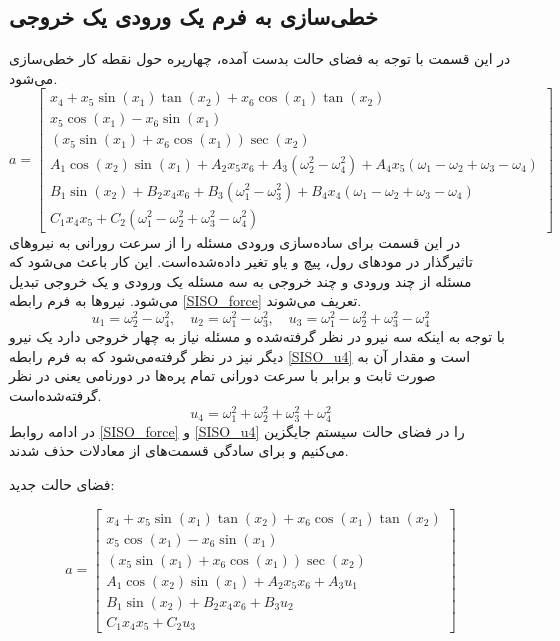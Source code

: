 \subsection{خطی‌سازی به فرم یک ورودی یک خروجی}\label{lin_SISO}
در این قسمت با توجه به فضای حالت بدست آمده، چهارپره حول نقطه کار خطی‌سازی می‌شود.
\begin{equation*}
	a = \begin{bmatrix}
		x_4 + x_5\sin(x_1)\tan(x_2) + x_6\cos(x_1)\tan(x_2)\\
		x_5\cos(x_1)- x_6\sin(x_1)\\
		(x_5\sin(x_1) + x_6\cos(x_1))\sec(x_2)\\
		A_1\cos(x_2)\sin(x_1) + 
		A_2x_5x_6 + A_3\left(\omega_2^2-\omega_4^2\right)+
		A_4x_5\left(\omega_1-\omega_2+\omega_3-\omega_4\right)\\
		B_1\sin(x_2) + 
		B_2x_4x_6 + B_3\left(\omega_1^2-\omega_3^2\right)+
		B_4x_4\left(\omega_1-\omega_2+\omega_3-\omega_4\right)\\
		C_1x_4x_5 + 
		C_2\left(\omega_1^2-\omega_2^2+\omega_3^2-\omega_4^2\right)
	\end{bmatrix}
\end{equation*} 
در این قسمت برای ساده‌سازی ورودی مسئله را از سرعت رورانی به نیروهای تاثیرگذار در مودهای رول، پیچ و یاو تغیر داده‌شده‌است. این کار باعث می‌شود که مسئله از چند ورودی و چند خروجی به سه مسئله یک ورودی و یک خروجی تبدیل می‌شود. نیروها به فرم رابطه 
\ref{SISO_force}
تعریف می‌شوند.
\begin{equation}\label{SISO_force}
	u_1 = \omega_2^2 - \omega_4^2, \quad
	u_2 = \omega_1^2 - \omega_3^2, \quad
	u_3 = \omega_1^2 - \omega_2^2  + \omega_3^2 - \omega_4^2
\end{equation}
با توجه به اینکه سه نیرو در نظر گرفته‌شده و مسئله نیاز به چهار خروجی دارد یک نیرو دیگر نیز در نظر گرفته‌می‌شود که به فرم رابطه 
\ref{SISO_u4}
است و مقدار آن به صورت ثابت و برابر با سرعت دورانی تمام پره‌ها در دورنامی یعنی
در نظر گرفته‌شده‌است.
\begin{equation}\label{SISO_u4}
	u_4 = \omega_1^2 + \omega_2^2  + \omega_3^2 + \omega_4^2
\end{equation}
در ادامه روابط 
\ref{SISO_force}
و
\ref{SISO_u4}
را در فضای حالت سیستم جایگزین می‌کنیم و برای سادگی قسمت‌های 
از معادلات حذف شدند.

فضای حالت جدید:

\begin{equation}
	a = \begin{bmatrix}
		x_4 + x_5\sin(x_1)\tan(x_2) + x_6\cos(x_1)\tan(x_2)\\
		x_5\cos(x_1)- x_6\sin(x_1)\\
		(x_5\sin(x_1) + x_6\cos(x_1))\sec(x_2)\\
		A_1\cos(x_2)\sin(x_1) + 
		A_2x_5x_6 + A_3u_1
		\\
		B_1\sin(x_2) + 
		B_2x_4x_6 + B_3u_2\\
		C_1x_4x_5 + 
		C_2u_3
	\end{bmatrix}
\end{equation} 

